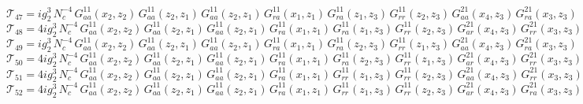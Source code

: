 \documentclass{article}
\begin{document}
\begin{equation*}
\mathcal{T}_{47} = i g_{2}^{3}\,N_c^{-4}\,G^{11}_{aa}\left(x_2,z_{2}\right) \, G^{11}_{aa}\left(z_{2},z_{1}\right) \, G^{11}_{aa}\left(z_{2},z_{1}\right) \, G^{11}_{ra}\left(x_1,z_{1}\right) \, G^{11}_{ra}\left(z_{1},z_{3}\right) \, G^{11}_{rr}\left(z_{2},z_{3}\right) \, G^{21}_{aa}\left(x_4,z_{3}\right) \, G^{21}_{ra}\left(x_3,z_{3}\right)
\end{equation*}
\begin{equation*}
\mathcal{T}_{48} = 4 i g_{2}^{3}\,N_c^{-4}\,G^{11}_{aa}\left(x_2,z_{2}\right) \, G^{11}_{aa}\left(z_{2},z_{1}\right) \, G^{11}_{aa}\left(z_{2},z_{1}\right) \, G^{11}_{ra}\left(x_1,z_{1}\right) \, G^{11}_{ra}\left(z_{1},z_{3}\right) \, G^{11}_{rr}\left(z_{2},z_{3}\right) \, G^{21}_{ar}\left(x_4,z_{3}\right) \, G^{21}_{rr}\left(x_3,z_{3}\right)
\end{equation*}
\begin{equation*}
\mathcal{T}_{49} = i g_{2}^{3}\,N_c^{-4}\,G^{11}_{aa}\left(x_2,z_{2}\right) \, G^{11}_{aa}\left(z_{2},z_{1}\right) \, G^{11}_{aa}\left(z_{2},z_{1}\right) \, G^{11}_{ra}\left(x_1,z_{1}\right) \, G^{11}_{ra}\left(z_{2},z_{3}\right) \, G^{11}_{rr}\left(z_{1},z_{3}\right) \, G^{21}_{aa}\left(x_4,z_{3}\right) \, G^{21}_{ra}\left(x_3,z_{3}\right)
\end{equation*}
\begin{equation*}
\mathcal{T}_{50} = 4 i g_{2}^{3}\,N_c^{-4}\,G^{11}_{aa}\left(x_2,z_{2}\right) \, G^{11}_{aa}\left(z_{2},z_{1}\right) \, G^{11}_{aa}\left(z_{2},z_{1}\right) \, G^{11}_{ra}\left(x_1,z_{1}\right) \, G^{11}_{ra}\left(z_{2},z_{3}\right) \, G^{11}_{rr}\left(z_{1},z_{3}\right) \, G^{21}_{ar}\left(x_4,z_{3}\right) \, G^{21}_{rr}\left(x_3,z_{3}\right)
\end{equation*}
\begin{equation*}
\mathcal{T}_{51} = 4 i g_{2}^{3}\,N_c^{-4}\,G^{11}_{aa}\left(x_2,z_{2}\right) \, G^{11}_{aa}\left(z_{2},z_{1}\right) \, G^{11}_{aa}\left(z_{2},z_{1}\right) \, G^{11}_{ra}\left(x_1,z_{1}\right) \, G^{11}_{rr}\left(z_{1},z_{3}\right) \, G^{11}_{rr}\left(z_{2},z_{3}\right) \, G^{21}_{aa}\left(x_4,z_{3}\right) \, G^{21}_{rr}\left(x_3,z_{3}\right)
\end{equation*}
\begin{equation*}
\mathcal{T}_{52} = 4 i g_{2}^{3}\,N_c^{-4}\,G^{11}_{aa}\left(x_2,z_{2}\right) \, G^{11}_{aa}\left(z_{2},z_{1}\right) \, G^{11}_{aa}\left(z_{2},z_{1}\right) \, G^{11}_{ra}\left(x_1,z_{1}\right) \, G^{11}_{rr}\left(z_{1},z_{3}\right) \, G^{11}_{rr}\left(z_{2},z_{3}\right) \, G^{21}_{ar}\left(x_4,z_{3}\right) \, G^{21}_{ra}\left(x_3,z_{3}\right)
\end{equation*}
\end{document}
